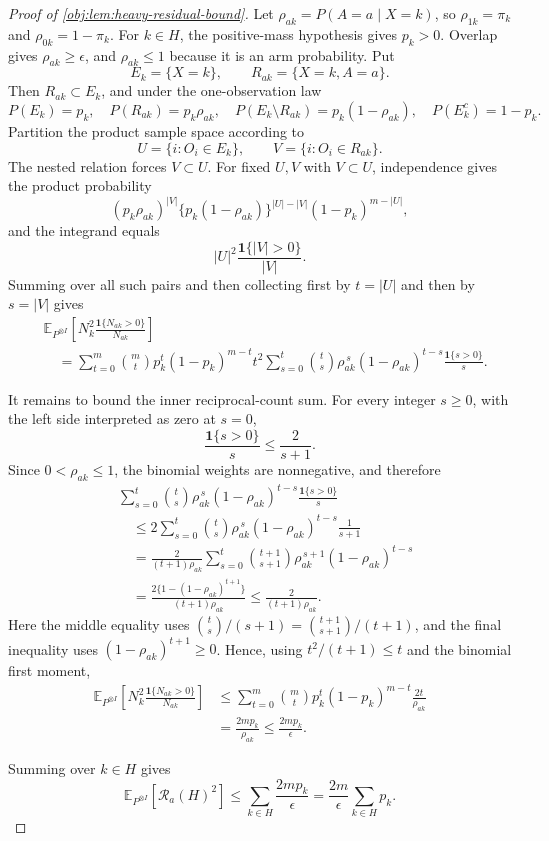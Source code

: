 \documentclass[11pt]{article}
\begin{document}
\begin{proof}[Proof of \cref{obj:lem:heavy-residual-bound}]
Let \(\rho_{ak}=P(A=a\mid X=k)\), so \(\rho_{1k}=\pi_k\) and \(\rho_{0k}=1-\pi_k\). For \(k\in H\), the positive-mass hypothesis gives \(p_k>0\). Overlap gives \(\rho_{ak}\ge\epsilon\), and \(\rho_{ak}\le1\) because it is an arm probability. Put
\[
E_k=\{X=k\},
\qquad
R_{ak}=\{X=k,A=a\}.
\]
Then \(R_{ak}\subset E_k\), and under the one-observation law
\[
P(E_k)=p_k,
\quad
P(R_{ak})=p_k\rho_{ak},
\quad
P(E_k\setminus R_{ak})=p_k(1-\rho_{ak}),
\quad
P(E_k^c)=1-p_k.
\]
Partition the product sample space according to
\[
U=\{i:O_i\in E_k\},
\qquad
V=\{i:O_i\in R_{ak}\}.
\]
The nested relation forces \(V\subset U\). For fixed \(U,V\) with \(V\subset U\), independence gives the product probability
\[
(p_k\rho_{ak})^{|V|}\{p_k(1-\rho_{ak})\}^{|U|-|V|}(1-p_k)^{m-|U|},
\]
and the integrand equals
\[
|U|^2\frac{\mathbf 1\{|V|>0\}}{|V|}.
\]
Summing over all such pairs and then collecting first by \(t=|U|\) and then by \(s=|V|\) gives
\[
\begin{aligned}
&\mathbb E_{P^{\otimes I}}\!\left[
N_k^2\frac{\mathbf 1\{N_{ak}>0\}}{N_{ak}}
\right] \\
&\quad=
\sum_{t=0}^{m}{m\choose t}p_k^t(1-p_k)^{m-t}t^2
\sum_{s=0}^{t}{t\choose s}\rho_{ak}^{\,s}(1-\rho_{ak})^{t-s}
\frac{\mathbf 1\{s>0\}}{s}.
\end{aligned}
\]

It remains to bound the inner reciprocal-count sum. For every integer \(s\ge0\), with the left side interpreted as zero at \(s=0\),
\[
\frac{\mathbf 1\{s>0\}}{s}\le \frac{2}{s+1}.
\]
Since \(0<\rho_{ak}\le1\), the binomial weights are nonnegative, and therefore
\[
\begin{aligned}
&\sum_{s=0}^{t}{t\choose s}\rho_{ak}^{\,s}(1-\rho_{ak})^{t-s}
\frac{\mathbf 1\{s>0\}}{s}\\
&\quad\le
2\sum_{s=0}^{t}{t\choose s}\rho_{ak}^{\,s}(1-\rho_{ak})^{t-s}\frac{1}{s+1}\\
&\quad=
\frac{2}{(t+1)\rho_{ak}}
\sum_{s=0}^{t}{t+1\choose s+1}\rho_{ak}^{\,s+1}(1-\rho_{ak})^{t-s}\\
&\quad=
\frac{2\{1-(1-\rho_{ak})^{t+1}\}}{(t+1)\rho_{ak}}
\le
\frac{2}{(t+1)\rho_{ak}}.
\end{aligned}
\]
Here the middle equality uses
\({t\choose s}/(s+1)={t+1\choose s+1}/(t+1)\), and the final inequality uses \((1-\rho_{ak})^{t+1}\ge0\). Hence, using \(t^2/(t+1)\le t\) and the binomial first moment,
\[
\begin{aligned}
\mathbb E_{P^{\otimes I}}\!\left[
N_k^2\frac{\mathbf 1\{N_{ak}>0\}}{N_{ak}}
\right]
&\le
\sum_{t=0}^{m}{m\choose t}p_k^t(1-p_k)^{m-t}\frac{2t}{\rho_{ak}}\\
&=
\frac{2mp_k}{\rho_{ak}}
\le
\frac{2mp_k}{\epsilon}.
\end{aligned}
\]

Summing over \(k\in H\) gives
\[
\mathbb E_{P^{\otimes I}}\!\left[\mathcal R_a(H)^2\right]
\le
\sum_{k\in H}\frac{2mp_k}{\epsilon}
=
\frac{2m}{\epsilon}\sum_{k\in H}p_k .
\]
\end{proof}
\end{document}
